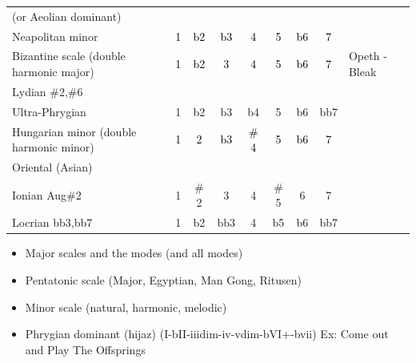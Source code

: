 \documentclass{article}
\begin{document}
\begin{table}[!h]
\begin{adjustwidth}{-2.5cm}{}
\begin{tabular}{l|ccc cccc|l}
		(or Aeolian dominant) & & & &   & & & &\\
		Neapolitan minor                   & \textcolor{black}{1} 
													  & \textcolor{black}{b2} 
													  & \textcolor{black}{b3} 
													  & \textcolor{black}{4} 
													  & \textcolor{black}{5}  
													  & \textcolor{black}{b6} 
													  & \textcolor{black}{7} &\\                                                                                
		\hline 
		Bizantine scale (double harmonic major)      & \textcolor{black}{1} 
													  & \textcolor{black}{b2} 
													  & \textcolor{black}{3} 
													  & \textcolor{black}{4} 
													  & \textcolor{black}{5}  
													  & \textcolor{black}{b6} 
													  & \textcolor{black}{7} & Opeth - Bleak\\
	    Lydian $\#$2,$\#$6                           & & & & & & & \\
	    Ultra-Phrygian                               &1 &b2 &b3 &b4 &5 &b6 &bb7 \\
		Hungarian minor (double harmonic minor)      & \textcolor{black}{1} 
													  & \textcolor{black}{2} 
													  & \textcolor{black}{b3} 
													  & \textcolor{black}{$\#$4} 
													  & \textcolor{black}{5}  
													  & \textcolor{black}{b6} 
													  & \textcolor{black}{7} & \\ 
	    Oriental (Asian)                             & & & & & & & \\
	    Ionian Aug$\#$2                             & 1&$\#$2 &3 &4 &$\#$5 &6 &7 \\
	    Locrian bb3,bb7                             & 1 &b2 &bb3 &4 &b5 &b6 &bb7 \\
		\hline 
	\end{tabular}
	\label{tab: }
	\end{adjustwidth}
\end{table}

\begin{itemize}
	\item Major scales and the modes (and all modes)
	\item Pentatonic scale (Major, Egyptian, Man Gong, Ritusen)
	\item Minor scale (natural, harmonic, melodic)
	\item Phrygian dominant (hijaz) (I-bII-iiidim-iv-vdim-bVI+-bvii)  Ex: Come out and Play The Offsprings
\end{itemize}
\end{document}
